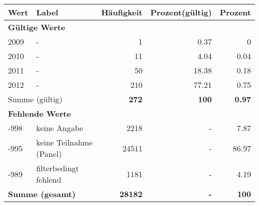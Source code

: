     \begin{longtable}{lXrrr}
     \toprule
     \textbf{Wert} & \textbf{Label} & \textbf{Häufigkeit} & \textbf{Prozent(gültig)} & \textbf{Prozent} \\
     \endhead
     \midrule
     \multicolumn{5}{l}{\textbf{Gültige Werte}}\\

     2009 &
     \multicolumn{1}{X}{ -  } &


       \num{1} &
       \num[round-mode=places,round-precision=2]{0.37} &
         \num[round-mode=places,round-precision=2]{0} \\

     2010 &
     \multicolumn{1}{X}{ -  } &


       \num{11} &
       \num[round-mode=places,round-precision=2]{4.04} &
         \num[round-mode=places,round-precision=2]{0.04} \\

     2011 &
     \multicolumn{1}{X}{ -  } &


       \num{50} &
       \num[round-mode=places,round-precision=2]{18.38} &
         \num[round-mode=places,round-precision=2]{0.18} \\

     2012 &
     \multicolumn{1}{X}{ -  } &


       \num{210} &
       \num[round-mode=places,round-precision=2]{77.21} &
         \num[round-mode=places,round-precision=2]{0.75} \\
     \midrule
     \multicolumn{2}{l}{Summe (gültig)} &
       \textbf{\num{272}} &
     \textbf{100} &
       \textbf{\num[round-mode=places,round-precision=2]{0.97}} \\
     \multicolumn{5}{l}{\textbf{Fehlende Werte}}\\
       -998 &
       keine Angabe &
         \num{2218} &
        - &
         \num[round-mode=places,round-precision=2]{7.87} \\
       -995 &
       keine Teilnahme (Panel) &
         \num{24511} &
        - &
         \num[round-mode=places,round-precision=2]{86.97} \\
       -989 &
       filterbedingt fehlend &
         \num{1181} &
        - &
         \num[round-mode=places,round-precision=2]{4.19} \\
     \midrule
     \multicolumn{2}{l}{\textbf{Summe (gesamt)}} &
          \textbf{\num{28182}} &
        \textbf{-} &
        \textbf{100} \\
     \bottomrule
     \end{longtable}
     

